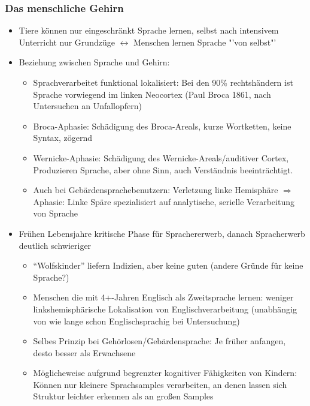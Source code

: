 \subsubsection{ Das menschliche Gehirn}
\begin{itemize}
	\item Tiere können nur eingeschränkt Sprache lernen, selbst nach intensivem Unterricht nur Grundzüge $\leftrightarrow$ Menschen lernen Sprache "'von selbst"'
	\item Beziehung zwischen Sprache und Gehirn:
		\begin{itemize}
			\item
				Sprachverarbeitet funktional lokalisiert: Bei den 90\% rechtshändern ist Sprache vorwiegend im linken Neocortex (Paul Broca 1861, nach Untersuchen an Unfallopfern)
			\item Broca-Aphasie: Schädigung des Broca-Areals, kurze Wortketten, keine Syntax, zögernd
			\item
				Wernicke-Aphasie: Schädigung des Wernicke-Areals/auditiver Cortex, Produzieren Sprache, aber ohne Sinn, auch Verständnis beeinträchtigt.
			\item
				Auch bei Gebärdensprachebenutzern: Verletzung linke Hemisphäre $\Rightarrow$ Aphasie: 
				Linke Späre spezialisiert auf analytische, serielle Verarbeitung von Sprache
		\end{itemize}
	\item
		Frühen Lebensjahre kritische Phase für Sprachererwerb, danach Spracherwerb deutlich schwieriger
		\begin{itemize}
			\item
				\enquote{Wolfskinder} liefern Indizien, aber keine guten (andere Gründe für keine Sprache?)
			\item
				Menschen die mit 4+-Jahren Englisch als Zweitsprache lernen: weniger linkshemisphärische Lokalisation von Englischverarbeitung (unabhängig von wie lange schon Englischsprachig bei Untersuchung)
			\item
				Selbes Prinzip bei Gehörlosen/Gebärdensprache: Je früher anfangen, desto besser als Erwachsene
			\item
				Möglicheweise aufgrund begrenzter kognitiver Fähigkeiten von Kindern: Können nur kleinere Sprachsamples verarbeiten, an denen lassen sich Struktur leichter erkennen als an großen Samples
		\end{itemize}
\end{itemize}

